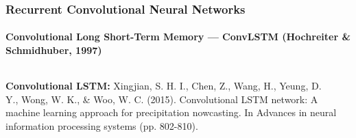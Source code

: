 \begin{frame}[t]
\frametitle{Recurrent Convolutional Neural Networks}
\framesubtitle{Convolutional Long Short-Term Memory --- ConvLSTM (Hochreiter \& Schmidhuber, 1997)}
\begin{columns}
	\begin{column}{0.3\textwidth}
				
		
		\textbf{Convolutional LSTM:}
		{\scriptsize
			Xingjian, S. H. I., Chen, Z., Wang, H., Yeung, D. Y., Wong, W. K., \& Woo, W. C. (2015). Convolutional LSTM network: A machine learning approach for precipitation nowcasting. In Advances in neural information processing systems (pp. 802-810).
		}
		
		
	\end{column}
	\vspace{-2em}	
	\begin{column}{0.7\textwidth}
		
		\lstmanim
	\end{column}
\end{columns}



\end{frame}



